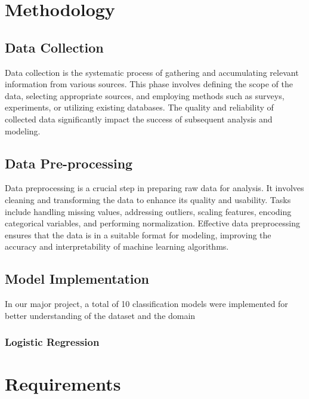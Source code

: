 \documentclass[ 12pt,a4paper,twocolumn,fleqn]{article}
\begin{document}
\clearpage

\newpage
 \pagestyle{fancy}
\thisfancypage{%
  \setlength{\fboxsep}{20pt}\doublebox}{}

\section{Methodology}

\subsection{Data Collection}
Data collection is the systematic process of gathering and accumulating relevant information from various sources. This phase involves defining the scope of the data, selecting appropriate sources, and employing methods such as surveys, experiments, or utilizing existing databases. The quality and reliability of collected data significantly impact the success of subsequent analysis and modeling.
\\

\subsection{Data Pre-processing}
Data preprocessing is a crucial step in preparing raw data for analysis. It involves cleaning and transforming the data to enhance its quality and usability. Tasks include handling missing values, addressing outliers, scaling features, encoding categorical variables, and performing normalization. Effective data preprocessing ensures that the data is in a suitable format for modeling, improving the accuracy and interpretability of machine learning algorithms.
\\

\subsection{Model Implementation}
In our major project, a total of 10 classification models were implemented for better understanding of the dataset and the domain
\\
\subsubsection{Logistic Regression}

\clearpage

\newpage
 \pagestyle{fancy}
\thisfancypage{%
  \setlength{\fboxsep}{20pt}\doublebox}{}

\section{Requirements}
\end{document}
